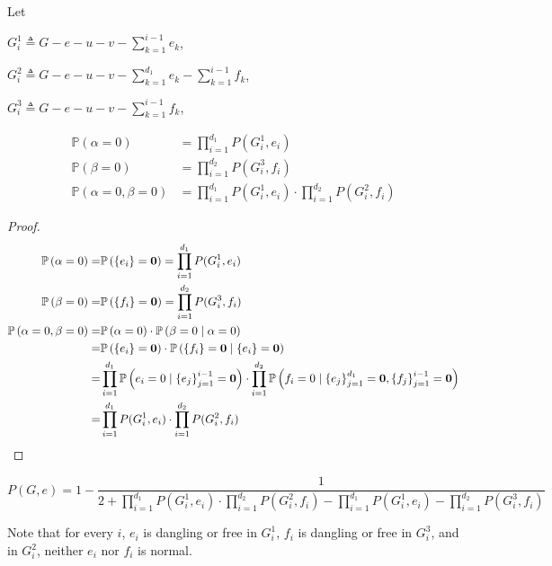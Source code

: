 Let

$G_i^1 \triangleq G - e - u - v - \sum_{k=1}^{i-1} e_k$,

$G_i^2 \triangleq G-e-u-v - \sum_{k=1}^{d_1}e_k - \sum_{k=1}^{i-1} f_k$,

$G_i^3 \triangleq G - e - u - v - \sum_{k=1}^{i-1} f_k$,


\begin{Prop}
	\begin{align*}
		\mathbb{P}\left( \alpha = 0\right) &= \prod_{i=1}^{d_1} P(G_i^1, e_i) \\
		\mathbb{P}\left( \beta = 0\right) &= \prod_{i=1}^{d_2} P(G_i^3, f_i) \\
		\mathbb{P}\left( \alpha = 0, \beta = 0 \right) &= \prod_{i=1}^{d_1} P(G_i^1, e_i) \cdot \prod_{i=1}^{d_2} P(G_i^2, f_i)
	\end{align*}
\end{Prop}

\begin{proof}
	\begin{align*}
		\mathbb{P}\left( \alpha = 0\right) =&\mathbb{P} \left( \left\{e_i\right\} = \mathbf{0}\right) =	\prod_{i=1}^{d_1} P(G_i^1, e_i) \\
		\mathbb{P}\left( \beta = 0\right) =&\mathbb{P} \left( \left\{f_i\right\} = \mathbf{0}\right) =	\prod_{i=1}^{d_2} P(G_i^3, f_i) \\
		\mathbb{P}\left( \alpha = 0, \beta = 0 \right) =& \mathbb{P} \left( \alpha = 0 \right) \cdot \mathbb{P}\left( \beta = 0 \mid \alpha = 0 \right) \\
		=& \mathbb{P} \left( \left\{e_i\right\} = \mathbf{0}\right) \cdot \mathbb{P} \left( \left\{f_i\right\} = \mathbf{0} \mid \left\{e_i\right\} = \mathbf{0} \right) \\
=&\prod_{i=1}^{d_1} \mathbb{P} \left( e_i = 0 \mid \left\{e_j\right\}_{j=1}^{i-1} = \mathbf{0} \right) \cdot \prod_{i=1}^{d_2} \mathbb{P} \left( f_i = 0 \mid \left\{e_j\right\}_{j=1}^{d_1} = \mathbf{0},\left\{f_j\right\}_{j=1}^{i-1} = \mathbf{0} \right) \\
=& \prod_{i=1}^{d_1} P(G_i^1, e_i) \cdot \prod_{i=1}^{d_2} P(G_i^2, f_i)
	\end{align*}
\end{proof}

\begin{Cor}
	\[P(G,e) =  1 - \frac{1}{2 + \prod_{i=1}^{d_1} P(G_i^1, e_i) \cdot \prod_{i=1}^{d_2} P(G_i^2, f_i) - \prod_{i=1}^{d_1} P(G_i^1, e_i) - \prod_{i=1}^{d_2} P(G_i^3, f_i)}\]
\end{Cor}

Note that for every $i$, $e_i$ is dangling or free in $G_i^1$, $f_i$ is dangling or free in $G_i^3$, and in $G_i^2$, neither $e_i$ nor $f_i$ is normal.

